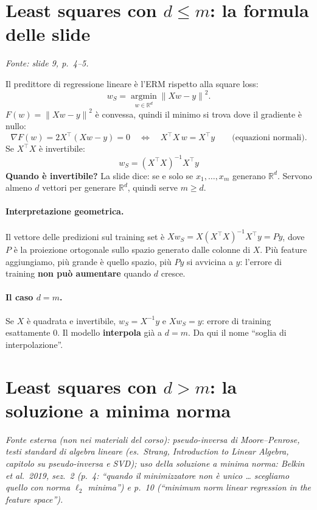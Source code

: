 \documentclass[11pt,a4paper]{article}
\newcommand{\R}{\mathbb{R}}
\newcommand{\norm}[1]{\left\lVert #1 \right\rVert}
\newcommand{\fonte}[1]{\par\noindent\textit{Fonte: #1}\par\smallskip}
\newcommand{\esterna}[1]{\par\noindent\textit{Fonte esterna (non nei materiali del corso): #1}\par\smallskip}
\begin{document}
\section{Least squares con $d \le m$: la formula delle slide}
\fonte{slide 9, p.~4--5.}

Il predittore di regressione lineare è l'ERM rispetto alla square loss:
\[
  w_S = \operatorname*{argmin}_{w \in \R^d} \norm{Xw - y}^2 .
\]
$F(w) = \norm{Xw - y}^2$ è convessa, quindi il minimo si trova dove il gradiente è nullo:
\[
  \nabla F(w) = 2X^\top(Xw - y) = 0
  \quad\Longleftrightarrow\quad
  X^\top X\, w = X^\top y \qquad \text{(equazioni normali)}.
\]
Se $X^\top X$ è invertibile:
\[
  \boxed{w_S = (X^\top X)^{-1} X^\top y}
\]
\textbf{Quando è invertibile?} La slide dice: se e solo se $x_1,\dots,x_m$ generano $\R^d$.
Servono almeno $d$ vettori per generare $\R^d$, quindi serve $m \ge d$.

\paragraph{Interpretazione geometrica.}
Il vettore delle predizioni sul training set è $Xw_S = X(X^\top X)^{-1}X^\top y = Py$, dove $P$ è la proiezione
ortogonale sullo spazio generato dalle colonne di $X$. Più feature aggiungiamo, più grande è quello spazio, più
$Py$ si avvicina a $y$: l'errore di training \textbf{non può aumentare} quando $d$ cresce.

\paragraph{Il caso $d = m$.}
Se $X$ è quadrata e invertibile, $w_S = X^{-1}y$ e $Xw_S = y$: errore di training esattamente $0$.
Il modello \textbf{interpola} già a $d = m$. Da qui il nome ``soglia di interpolazione''.

\section{Least squares con $d > m$: la soluzione a minima norma}
\esterna{pseudo-inversa di Moore--Penrose, testi standard di algebra lineare (es.\ Strang, \emph{Introduction to Linear
Algebra}, capitolo su pseudo-inversa e SVD); uso della soluzione a minima norma: Belkin et al.\ 2019, sez.~2 (p.~4: ``quando il minimizzatore non è unico \dots{} scegliamo quello con norma $\ell_2$ minima'') e p.~10 (``minimum norm linear regression in the feature space'').}
\end{document}

